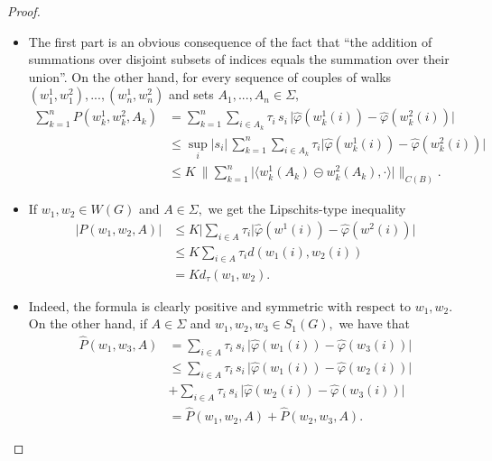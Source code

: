 \documentclass[preprint,12pt]{elsarticle}
\begin{document}
\begin{proof}
\begin{itemize}
\item[(i)] The first part is an obvious consequence of the fact that ``the addition of summations over disjoint subsets of indices equals the summation over their union''.
On the other hand, 
for every sequence of couples of walks $(w^1_1,w^2_1), ..., (w^1_n, w^2_n)$ and sets $A_1,...,A_n \in \Sigma,$
\begin{align*}
\sum_{k=1}^n P(w^1_k,w^2_k, A_k) &= \sum_{k=1}^n \sum_{i \in A_k} \tau_i \, s_i \, \big| \widehat \varphi(w^1_k(i))-  \widehat \varphi(w^2_k(i)) \big| \\
&\le \sup_{i} |s_i| \,
\sum_{k=1}^n \sum_{i \in A_k} \tau_i  \big| \widehat \varphi(w^1_k(i))-  \widehat \varphi(w^2_k(i)) \big| \\
&\le K \ \Big\|
 \sum_{k=1}^n \big| \langle w^1_k(A_k) \circleddash w^2_k(A_k), \cdot \rangle \big| \Big\|_{C(B)}.
\end{align*}

\item[(ii)] If $w_1,w_2 \in W(G)$ and $A \in \Sigma,$ we get the Lipschits-type inequality
\begin{align*}
\big| P(w_1,w_2,A) \big| &\le K \Big| \sum_{i \in A} \tau_i  \big| \widehat \varphi(w^1(i))-  \widehat \varphi(w^2(i)) \big| \\
&\le K \sum_{i \in A} \tau_i d(w_1(i), w_2(i)) \\
&= K d_\tau(w_1,w_2).
\end{align*}

\item[(iii)] Indeed, the formula is clearly positive and symmetric with respect to $w_1,w_2.$ On the other hand, if $A \in \Sigma$ and $w_1,w_2, w_3 \in S_1(G),$ we have that
\begin{align*}
\widehat P(w_1,w_3,A) &= \sum_{i \in A} \tau_i \, s_i \, \big| \widehat \varphi(w_1(i))-  \widehat \varphi(w_3(i)) \big| \\
&\le
\sum_{i \in A} \tau_i \, s_i \, \big| \widehat \varphi(w_1(i))-  \widehat \varphi(w_2(i)) \big| 
\\ 
& +
\sum_{i \in A} \tau_i \, s_i \, \big| \widehat \varphi(w_2(i))-  \widehat \varphi(w_3(i)) \big| \\
&= \widehat P(w_1,w_2,A) + \widehat P(w_2,w_3,A).
\end{align*}
\end{itemize}

\end{proof}
\end{document}
